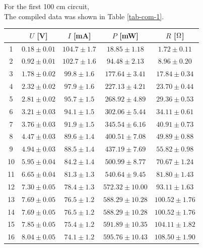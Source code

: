 \newpage

For the first 100 cm circuit,\\

The compiled data was shown in Table \ref{tab-com-1}.\\

\begin{table}[!h]
\begin{center}
\begin{tabular}{|c|c|c|c|c|}
\hline
& $U$ [V] & $I$ [mA] & $P$ [mW] & $R$ [$\rm \Omega$] \\
\hline
1	&	$0.18 \pm 0.01$	&	$104.7 \pm 1.7$	&	$18.85 \pm 1.18$	&	$1.72 \pm 0.11$	\\
\hline
2	&	$0.92 \pm 0.01$	&	$102.7 \pm 1.6$	&	$94.48 \pm 2.13$	&	$8.96 \pm 0.20$	\\
\hline
3	&	$1.78 \pm 0.02$	&	$99.8 \pm 1.6$	&	$177.64 \pm 3.41$	&	$17.84 \pm 0.34$	\\
\hline
4	&	$2.32 \pm 0.02$	&	$97.9 \pm 1.6$	&	$227.13 \pm 4.21$	&	$23.70 \pm 0.44$	\\
\hline
5	&	$2.81 \pm 0.02$	&	$95.7 \pm 1.5$	&	$268.92 \pm 4.89$	&	$29.36 \pm 0.53$	\\
\hline
6	&	$3.21 \pm 0.03$	&	$94.1 \pm 1.5$	&	$302.06 \pm 5.44$	&	$34.11 \pm 0.61$	\\
\hline
7	&	$3.76 \pm 0.03$	&	$91.9 \pm 1.5$	&	$345.54 \pm 6.16$	&	$40.91 \pm 0.73$	\\
\hline
8	&	$4.47 \pm 0.03$	&	$89.6 \pm 1.4$	&	$400.51 \pm 7.08$	&	$49.89 \pm 0.88$	\\
\hline
9	&	$4.94 \pm 0.03$	&	$88.5 \pm 1.4$	&	$437.19 \pm 7.69$	&	$55.82 \pm 0.98$	\\
\hline
10	&	$5.95 \pm 0.04$	&	$84.2 \pm 1.4$	&	$500.99 \pm 8.77$	&	$70.67 \pm 1.24$	\\
\hline
11	&	$6.65 \pm 0.04$	&	$81.3 \pm 1.3$	&	$540.64 \pm 9.45$	&	$81.80 \pm 1.43$	\\
\hline
12	&	$7.30 \pm 0.05$	&	$78.4 \pm 1.3$	&	$572.32 \pm 10.00$	&	$93.11 \pm 1.63$	\\
\hline
13	&	$7.69 \pm 0.05$	&	$76.5 \pm 1.2$	&	$588.29 \pm 10.28$	&	$100.52 \pm 1.76$	\\
\hline
14	&	$7.69 \pm 0.05$	&	$76.5 \pm 1.2$	&	$588.29 \pm 10.28$	&	$100.52 \pm 1.76$	\\
\hline
15	&	$7.85 \pm 0.05$	&	$75.4 \pm 1.2$	&	$591.89 \pm 10.35$	&	$104.11 \pm 1.82$	\\
\hline
16	&	$8.04 \pm 0.05$	&	$74.1 \pm 1.2$	&	$595.76 \pm 10.43$	&	$108.50 \pm 1.90$	\\

\end{tabular}
\end{center}
\end{table}
